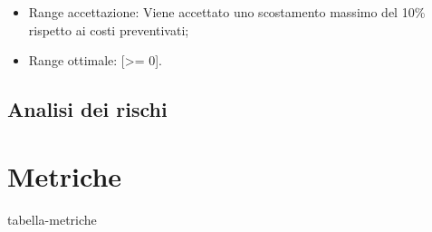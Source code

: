 \begin{itemize}
	\item Range accettazione: Viene accettato uno scostamento massimo del 10\% rispetto ai costi preventivati;
	\item Range ottimale: [>= 0].
\end{itemize}


\subsection{Analisi dei rischi}
\section{Metriche}
tabella-metriche